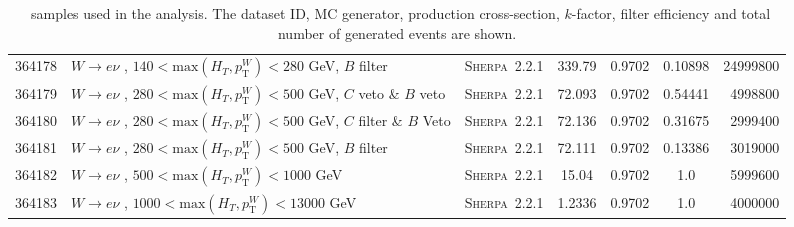 \begin{table}[!htb]
{\begin{tabular}{|c|l|c|c|c|c|r|}
      364178 & $W \to e\nu $ , $140<\text{max}(H_T,p_{\text{T}}^W)<280$ GeV, $B$ filter & \textsc{Sherpa}~2.2.1 &               339.79         & 0.9702& 0.10898 &  24999800\\
      364179 & $W \to e\nu $ , $280<\text{max}(H_T,p_{\text{T}}^W)<500$ GeV, $C$ veto \& $B$ veto & \textsc{Sherpa}~2.2.1 &     72.093         & 0.9702& 0.54441 &  4998800 \\
      364180 & $W \to e\nu $ , $280<\text{max}(H_T,p_{\text{T}}^W)<500$ GeV,  $C$ filter \& $B$ Veto & \textsc{Sherpa}~2.2.1 &  72.136         & 0.9702& 0.31675 &  2999400 \\
      364181 & $W \to e\nu $ , $280<\text{max}(H_T,p_{\text{T}}^W)<500$ GeV, $B$ filter & \textsc{Sherpa}~2.2.1 &               72.111         & 0.9702& 0.13386 &  3019000 \\
      364182 & $W \to e\nu $ , $500<\text{max}(H_T,p_{\text{T}}^W)<1000$ GeV                      & \textsc{Sherpa}~2.2.1 &     15.04          & 0.9702& 1.0 	&  5999600 \\
      364183 & $W \to e\nu $ , $1000<\text{max}(H_T,p_{\text{T}}^W)<13000$ GeV                    & \textsc{Sherpa}~2.2.1 &     1.2336         & 0.9702& 1.0 	&  4000000 \\
      \hline
      \hline
    \end{tabular}
    \caption{\wjets\ samples used in the analysis. The dataset ID, MC generator,
      production cross-section, $k$-factor, filter efficiency and total number of
      generated events are shown.}
    \label{tabular:mc_samples_Wjets}
  }
\end{table}